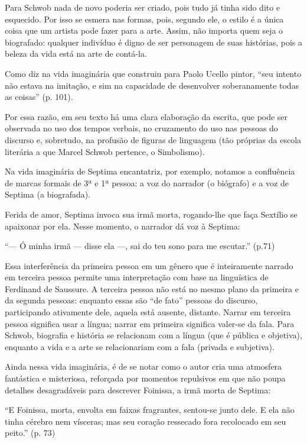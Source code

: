 \documentclass[12pt]{extarticle}
\begin{document}
Para Schwob nada de novo poderia ser criado, pois tudo já tinha sido
dito e esquecido. Por isso se esmera nas formas, pois, segundo ele, o
estilo é a única coisa que um artista pode fazer para a arte. Assim, não
importa quem seja o biografado: qualquer indivíduo é digno de ser
personagem de suas histórias, pois a beleza da vida está na arte de
contá-la.

Como diz na vida imaginária que construiu para Paolo Ucello pintor,
``seu intento não estava na imitação, e sim na capacidade de desenvolver
soberanamente todas as coisas'' (p. 101).

Por essa razão, em seu texto há uma clara elaboração da escrita, que
pode ser observada no uso dos tempos verbais, no cruzamento do uso nas
pessoas do discurso e, sobretudo, na profusão de figuras de linguagem
(tão próprias da escola literária a que Marcel Schwob pertence, o
Simbolismo).

Na vida imaginária de Septima encantatriz, por exemplo, notamos a
confluência de marcas formais de 3ª e 1ª pessoa: a voz do narrador (o
biógrafo) e a voz de Septima (a biografada).

Ferida de amor, Septima invoca sua irmã morta, rogando-lhe que faça
Sextílio se apaixonar por ela. Nesse momento, o narrador dá voz à
Septima:

``--- Ó minha irmã --- disse ela ---, sai do teu sono para me escutar.''
(p.71)

Essa interferência da primeira pessoa em um gênero que é inteiramente
narrado em terceira pessoa permite uma interpretação com base na
linguística de Ferdinand de Saussure. A terceira pessoa não está no
mesmo plano da primeira e da segunda pessoas: enquanto essas são ``de
fato'' pessoas do discurso, participando ativamente dele, aquela está
ausente, distante. Narrar em terceira pessoa significa usar a língua;
narrar em primeira significa valer-se da fala. Para Schwob, biografia e
história se relacionam com a língua (que é pública e objetiva), enquanto
a vida e a arte se relacionariam com a fala (privada e subjetiva).

Ainda nessa vida imaginária, é de se notar como o autor cria uma
atmosfera fantástica e misteriosa, reforçada por momentos repulsivos em
que não poupa detalhes desagradáveis para descrever Foinissa, a irmã
morta de Septima:

``E Foinissa, morta, envolta em faixas fragrantes, sentou-se junto dele.
E ela não tinha cérebro nem vísceras; mas seu coração ressecado fora
recolocado em seu peito.'' (p. 73)
\end{document}
